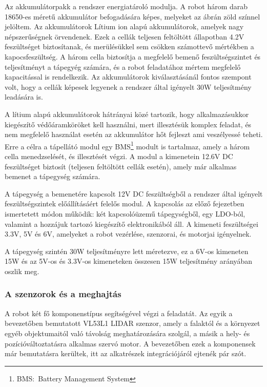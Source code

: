 \medskip

Az akkumulátorpakk a rendszer energiatároló modulja. A robot három darab 18650-es
méretű akkumulátor befogadására képes, melyeket az ábrán zöld színnel
jelöltem. Az akkumulátorok Lítium ion alapú akkumulátorok, amelyek nagy
népszerűségnek örvendenek. Ezek a cellák teljesen feltöltött állapotban 4.2V
feszültséget biztosítanak, és merülésükkel sem csökken számottevő mértékben a
kapocsfeszültség. A három cella biztosítja a megfelelő bemenő feszültségszintet
és teljesítményt a tápegyég számára, és a robot feladatához mértem megfelelő
kapacitással is rendelkezik. Az akkumulátorok kiválasztásánál fontos szempont
volt, hogy a cellák képesek legyenek a rendszer által igényelt 30W teljesítmény
leadására is.

\medskip

A lítium alapú akkumulátorok hátrányai közé tartozik, hogy alkalmazásukkor
kiegészítő védőáramköröket kell használni, mert illesztésük komplex feladat, és
nem megfelelő használat esetén az akkumulátor hőt fejleszt ami veszélyessé
teheti. Erre a célra a tápellátó modul egy BMS\footnote{BMS:~Battery Management
System} modult is tartalmaz, amely a három cella menedzselését, és illesztését
végzi. A modul a kimenetein 12.6V DC feszültséget biztosít (teljesen feltöltött
cellák esetén), amely már alkalmas bemenet a tápegység számára.

\medskip

A tápegység a bemenetére kapcsolt 12V DC feszültségből a rendszer által igényelt
feszültségszintek előállításáért felelős modul. A kapcsolás az előző fejezetben
ismertetett módon működik: két kapcsolóüzemű tápegységből, egy LDO-ból, valamint
a hozzájuk tartozó kiegészítő elektronikából áll. A kimeneti feszültségei 3.3V,
5V és 6V, amelyeket a robot vezérlése, szenzorai, és motorjai igényelnek.

A tápegység szintén 30W teljesítményre lett méretezve, ez a 6V-os kimeneten 15W
és az 5V-os és 3.3V-os kimeneteken összesen 15W teljesítmény arányában oszlik
meg. 

\subsubsection{A szenzorok és a meghajtás}

A robot két fő komponenstípus segítségével végzi a feladatát. Az egyik a
bevezetőben bemutatott VL53L1 LIDAR szenzor, amely a falaktól és a környezet
egyéb objektumaitól való távolság meghatározására szolgál, a másik a hely- és
pozícióváltoztatásra alkalmas szervó motor. A bevezetőben ezek a komponensek már
bemutatásra kerültek, itt az alkatrészek integrációjáról ejtenék pár szót.

